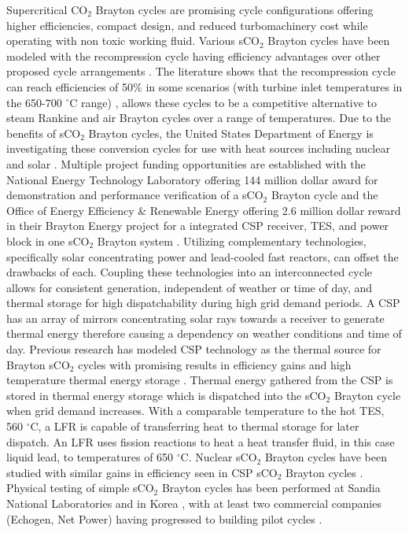 Supercritical CO$_2$ Brayton cycles are promising cycle configurations offering higher efficiencies, compact design, and reduced turbomachinery cost while operating with non toxic working fluid. Various sCO$_2$ Brayton cycles have been modeled with the recompression cycle having efficiency advantages over other proposed cycle arrangements \cite{turchi_2013,ahn_2014,wang_2018}. The literature shows that the recompression cycle can reach efficiencies of 50\% in some scenarios (with turbine inlet temperatures in the 650-700 $^{\circ}$C range) \cite{turchi_2013,wright_2009}, allows these cycles to be a competitive alternative to steam Rankine and air Brayton cycles over a range of temperatures.   Due to the benefits of sCO$_2$ Brayton cycles, the United States Department of Energy is investigating these conversion cycles for use with heat sources including nuclear and solar \cite{doe_2012}. Multiple project funding opportunities are established with the National Energy Technology Laboratory offering 144 million dollar award for demonstration and performance verification of a sCO$_2$ Brayton cycle \cite{netl_2016} and the Office of Energy Efficiency \& Renewable Energy offering 2.6 million dollar reward in their Brayton Energy project for a integrated CSP receiver, TES, and power block in one sCO$_2$ Brayton system \cite{seto_2015}. Utilizing complementary technologies, specifically solar concentrating power and lead-cooled fast reactors, can offset the drawbacks of each. Coupling these technologies into an interconnected cycle allows for consistent generation, independent of weather or time of day, and thermal storage for high dispatchability during high grid demand periods.
A CSP has an array of mirrors concentrating solar rays towards a receiver to generate thermal energy therefore causing a dependency on weather conditions and time of day. Previous research has modeled CSP technology as the thermal source for Brayton sCO$_2$ cycles with promising results in efficiency gains and high temperature thermal energy storage \cite{turchi_2013, iverson_2013, ho_2015, wang_2018, neises_2020}. Thermal energy gathered from the CSP is stored in thermal energy storage which is dispatched into the sCO$_2$ Brayton cycle when grid demand increases. With a comparable temperature to the hot TES, 560 $^{\circ}$C, a LFR is capable of transferring heat to thermal storage for later dispatch. An LFR uses fission reactions to heat a heat transfer fluid, in this case liquid lead, to temperatures of 650 $^{\circ}$C. Nuclear sCO$_2$ Brayton cycles have been studied with similar gains in efficiency seen in CSP sCO$_2$ Brayton cycles \cite{ dostal_2004, luo_2020}. Physical testing of simple sCO$_2$ Brayton cycles has been performed at Sandia National Laboratories \cite{wright_2011} and in Korea \cite{cha_2016}, with at least two commercial companies (Echogen, Net Power) having progressed to building pilot cycles  \cite{held_2015,fetvedt_2016}. 

